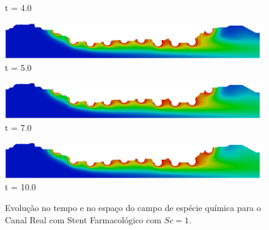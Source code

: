\begin{figure}[H]
\begin{minipage}{.50\linewidth}
      t = 4.0
     \end{minipage}%
     \begin{minipage}{.50\linewidth}
      \centering
      \includegraphics[scale=0.12]{./02_chaps/cap_solution/figure/conc1_RealStrut10000.png}\\
      t = 5.0
     \end{minipage}
     \begin{minipage}{.50\linewidth}
     \medskip
      \centering
      \includegraphics[scale=0.12]{./02_chaps/cap_solution/figure/conc1_RealStrut14000.png}\\
      t = 7.0
     \end{minipage}%
     \begin{minipage}{.50\linewidth}
     \medskip
      \centering
      \includegraphics[scale=0.12]{./02_chaps/cap_solution/figure/conc1_RealStrut20000.png}\\
      t = 10.0
     \end{minipage}
     \medskip
     \caption{Evolução no tempo e no espaço do campo de espécie química para o Canal Real com Stent Farmacológico com $Sc=1$.}
     \label{conc field real stent sc 1}
\end{figure}

